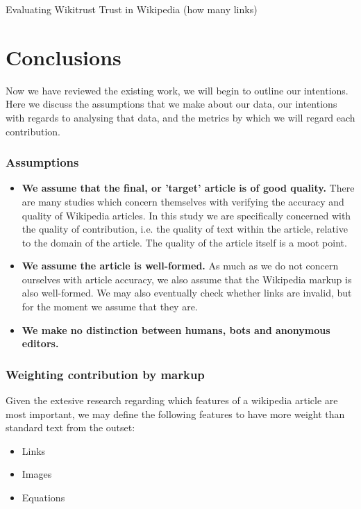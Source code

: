 \documentclass[a4paper,11pt,twoside,notitlepage]{article}
\begin{document}
       \cite{Lucassen2011} Evaluating Wikitrust
       \cite{Lucassen2010} Trust in Wikipedia (how many links)
       


        \section{Conclusions}
        Now we have reviewed the existing work, we will begin to
        outline our intentions. Here we discuss the assumptions that
        we make about our data, our intentions with regards to
        analysing that data, and the metrics by which we will regard
        each contribution.

        \subsubsection*{Assumptions}
        \begin{itemize}
          \item \textbf{We assume that the final, or 'target' article
            is of good quality.} There are many studies which concern
            themselves with verifying the accuracy and quality of
            Wikipedia articles. In this study we are specifically
            concerned with the quality of contribution, i.e. the
            quality of text within the article, relative to the domain
            of the article. The quality of the article itself is a
            moot point.
          \item \textbf{We assume the article is well-formed.} As much
            as we do not concern ourselves with article accuracy, we
            also assume that the Wikipedia markup is also
            well-formed. We may also eventually check whether links
            are invalid, but for the moment we assume that they are.
          \item \textbf{We make no distinction between humans, bots
            and anonymous editors.}
        \end{itemize}
        
        \subsubsection*{Weighting contribution by markup}
        Given the extesive research regarding which features of a
        wikipedia article are most important, we may define the
        following features to have more weight than standard text from
        the outset:
        \begin{itemize}
          \item Links
          \item Images
          \item Equations
        \end{itemize}
\end{document}
